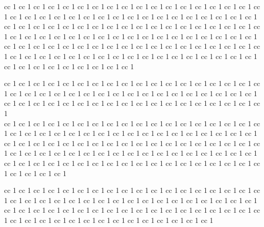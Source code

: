 \documentclass[11pt]{article}
\begin{document}
 cc 1  cc 1  cc 1  cc 1  cc 1  cc 1  cc 1  cc 1  cc 1  cc 1  cc 1  cc 1  cc 1  cc 1  cc 1  cc 1  cc 1  cc 1  cc 1  cc 1  cc 1  cc 1  cc 1  cc 1  cc 1  cc 1  cc 1  cc 1  cc 1  cc 1  cc 1  cc 1  cc 1  cc 1  cc 1  cc 1  cc 1  cc 1  cc 1  cc 1  cc 1  cc 1  cc 1  cc 1  cc 1  cc 1  cc 1  cc 1  cc 1  cc 1  cc 1  cc 1  cc 1
 cc 1  cc 1  cc 1  cc 1  cc 1  cc 1  cc 1  cc 1  cc 1  cc 1  cc 1  cc 1  cc 1  cc 1  cc 1  cc 1  cc 1  cc 1  cc 1  cc 1  cc 1  cc 1  cc 1  cc 1  cc 1  cc 1  cc 1  cc 1  cc 1  cc 1  cc 1  cc 1  cc 1  cc 1
 cc 1  cc 1  cc 1  cc 1  cc 1  cc 1  cc 1  cc 1  cc 1  cc 1  cc 1  cc 1  cc 1  cc 1  cc 1  cc 1  cc 1  cc 1  cc 1  cc 1  cc 1  cc 1  cc 1  cc 1  cc 1  cc 1  cc 1


 cc 1  cc 1  cc 1  cc 1  cc 1  cc 1  cc 1  cc 1  cc 1  cc 1  cc 1  cc 1  cc 1  cc 1  cc 1  cc 1  cc 1  cc 1  cc 1  cc 1  cc 1  cc 1  cc 1  cc 1  cc 1  cc 1  cc 1  cc 1  cc 1  cc 1  cc 1  cc 1  cc 1  cc 1
 cc 1  cc 1  cc 1  cc 1  cc 1  cc 1  cc 1  cc 1  cc 1  cc 1  cc 1  cc 1  cc 1  cc 1  cc 1  cc 1  cc 1  cc 1  cc 1 \\  cc 1  cc 1  cc 1  cc 1  cc 1  cc 1  cc 1  cc 1  cc 1  cc 1  cc 1  cc 1  cc 1  cc 1  cc 1  cc 1  cc 1  cc 1  cc 1  cc 1  cc 1  cc 1  cc 1  cc 1  cc 1  cc 1  cc 1  cc 1  cc 1  cc 1  cc 1  cc 1  cc 1  cc 1  cc 1  cc 1  cc 1  cc 1  cc 1  cc 1  cc 1  cc 1  cc 1  cc 1  cc 1  cc 1  cc 1  cc 1  cc 1  cc 1  cc 1  cc 1  cc 1  cc 1  cc 1  cc 1  cc 1  cc 1  cc 1
 cc 1  cc 1  cc 1  cc 1  cc 1  cc 1  cc 1  cc 1  cc 1  cc 1  cc 1  cc 1  cc 1  cc 1  cc 1  cc 1  cc 1  cc 1  cc 1  cc 1  cc 1  cc 1  cc 1  cc 1  cc 1  cc 1  cc 1  cc 1  cc 1  cc 1  cc 1  cc 1  cc 1

 cc 1  cc 1  cc 1  cc 1  cc 1  cc 1  cc 1  cc 1  cc 1  cc 1  cc 1  cc 1  cc 1  cc 1  cc 1  cc 1  cc 1  cc 1  cc 1  cc 1  cc 1  cc 1  cc 1  cc 1  cc 1  cc 1  cc 1  cc 1  cc 1
 cc 1  cc 1  cc 1  cc 1  cc 1  cc 1  cc 1  cc 1  cc 1  cc 1  cc 1  cc 1  cc 1  cc 1  cc 1  cc 1  cc 1  cc 1  cc 1  cc 1  cc 1  cc 1  cc 1  cc 1  cc 1
 cc 1  cc 1  cc 1  cc 1  cc 1  cc 1  cc 1  cc 1  cc 1  cc 1  cc 1  cc 1  cc 1
\end{document}
